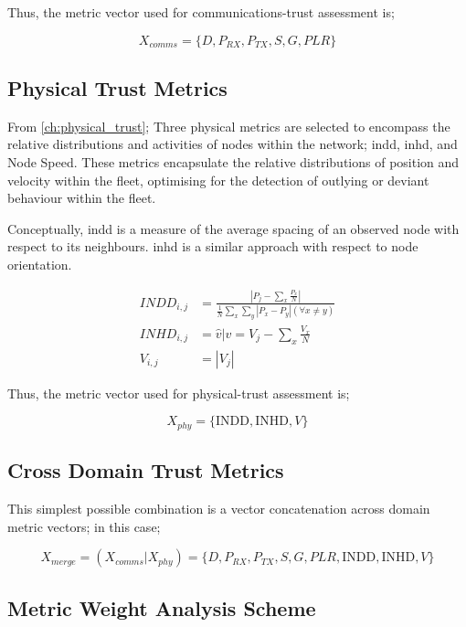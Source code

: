 Thus, the metric vector used for communications-trust assessment is;

\begin{equation}
  X_{comms}=\{D, P_{RX}, P_{TX}, S, G, PLR\}
  \label{eq:comms_vector}
\end{equation}

\subsection{Physical Trust Metrics}

From \autoref{ch:physical_trust}; Three physical metrics are selected to encompass the relative distributions and activities of nodes within the network; \gls{indd}, \gls{inhd}, and Node Speed. These metrics encapsulate the relative distributions of position and velocity within the fleet, optimising for the detection of outlying or deviant behaviour within the fleet.

Conceptually, \gls{indd} is a measure of the average spacing of an observed node with respect to its neighbours. \gls{inhd} is a similar approach with respect to node orientation.

\begin{align}
  INDD_{i,j} &= \frac{|P_j - \sum_x \frac{P_x}{N}|}{\frac{1}{N}\sum_x \sum_y{|P_x - P_y| (\forall x \neq y)}}\\
  INHD_{i,j} &= \hat{v} \vert v= V_j - \sum_x{\frac{V_x}{N}}\\
  V_{i,j} &= |V_j|
\end{align}

Thus, the metric vector used for physical-trust assessment is;

\begin{equation}
  X_{phy}=\{\text{INDD}, \text{INHD}, V\}
  \label{eq:phys:vector}
\end{equation}


\subsection{Cross Domain Trust Metrics}
This simplest possible combination is a vector concatenation across domain metric vectors; in this case; 

\begin{equation}
  X_{merge} =  (X_{comms}|X_{phy}) = \{D, P_{RX}, P_{TX}, S, G, PLR, \text{INDD}, \text{INHD}, V\}
  \label{eq:merge:vector}
\end{equation}


\subsection{Metric Weight Analysis Scheme}

